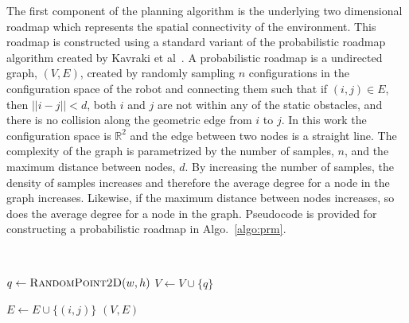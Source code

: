 The first component of the planning algorithm is the underlying two dimensional
roadmap which represents the spatial connectivity of the environment. This
roadmap is constructed using a standard variant of the probabilistic roadmap
algorithm created by Kavraki et al~\cite{prm}. A probabilistic roadmap is a
undirected graph, $(V, E)$, created by randomly sampling $n$ configurations in
the configuration space of the robot and connecting them such that if $(i, j)
\in E$, then $||i - j|| < d$, both $i$ and $j$ are not within any of the static
obstacles, and there is no collision along the geometric edge from $i$ to $j$.
In this work the configuration space is $\mathbb{R}^2$ and the edge between two
nodes is a straight line. The complexity of the graph is parametrized by the
number of samples, $n$, and the maximum distance between nodes, $d$. By
increasing the number of samples, the density of samples increases and
therefore the average degree for a node in the graph increases. Likewise, if
the maximum distance between nodes increases, so does the average degree for a
node in the graph. Pseudocode is provided for constructing a probabilistic
roadmap in Algo.~\ref{algo:prm}.

\begin{algorithm}[ht]
    \caption{$\Function{Roadmap}(n, d, w, h, O)$}
    \\
    \label{algo:prm}
    \begin{algorithmic}[1]
        \setcounter{ALC@line}{0}
        \vspace*{1mm}

            \STATE $q \leftarrow \Function{RandomPoint2D}(w, h)$
                \STATE $V \leftarrow V \cup \{q\}$
            \ENDIF
        \ENDFOR

                    \STATE $E \leftarrow E \cup \{(i, j)\}$
                \ENDIF
            \ENDFOR
        \ENDFOR
        \RETURN $(V,E)$
    \end{algorithmic}
\end{algorithm}

